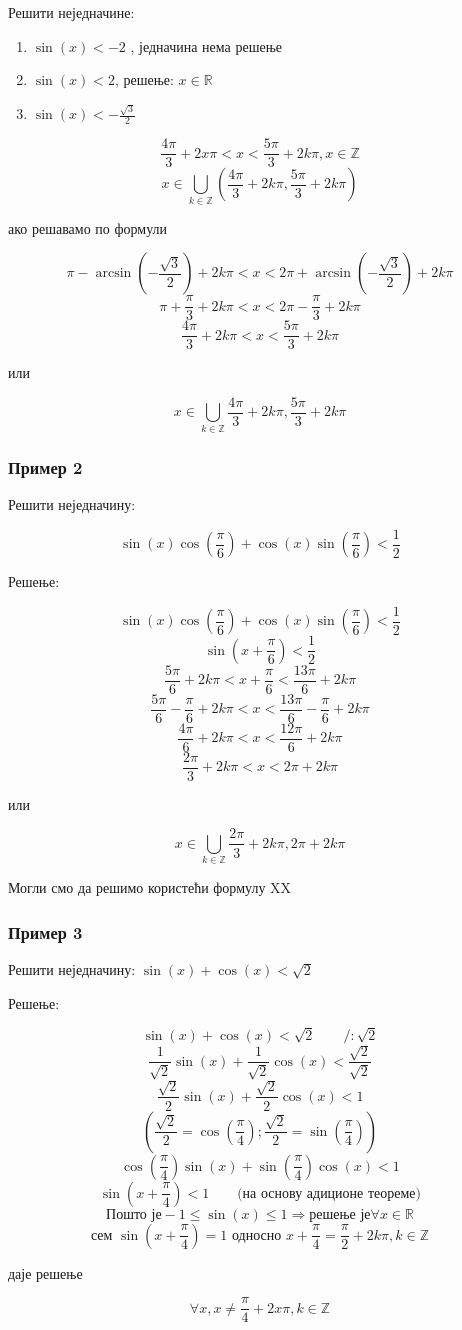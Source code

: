 \documentclass[../diplomski.tex]{subfiles}
\begin{document}
Решити неједначине:

\begin{enumerate}[label=\alph*)]
\item $\sin(x)<-2$ , једначина нема решење
\item $\sin(x)<2$, решење: $x\in\mathbb{R}$
\item $\sin(x)<-\frac{\sqrt3}{2}$
\end{enumerate}


\[\frac{4\pi}{3}+2x\pi<x<\frac{5\pi}{3}+2k\pi,x\in\mathbb{Z}\]
\[x\in\bigcup_{k\in\mathbb{Z}}(\frac{4\pi}{3}+2k\pi,\frac{5\pi}{3}+2k\pi)\]

ако решавамо по формули

\[\pi-\arcsin\left(-\frac{\sqrt{3}}{2}\right)+2k\pi<x<2\pi+\arcsin\left(-\frac{\sqrt{3}}{2}\right)+2k\pi\]
\[\pi+\frac{\pi}{3}+2k\pi<x<2\pi-\frac{\pi}{3}+2k\pi\]
\[\frac{4\pi}{3}+2k\pi<x<\frac{5\pi}{3}+2k\pi\]
\centerline{или}
\[x\in\bigcup_{k\in\mathbb{Z}}\frac{4\pi}{3}+2k\pi,\frac{5\pi}{3}+2k\pi\]


\subsubsection{Пример 2}

Решити неједначину:

\[\sin(x)\cos\left(\frac{\pi}{6}\right)+\cos(x)\sin\left(\frac{\pi}{6}\right)<\frac{1}{2}\]

Решење:

\[\sin(x)\cos\left(\frac{\pi}{6}\right)+\cos(x)\sin\left(\frac{\pi}{6}\right)<\frac{1}{2}\]
\[\sin\left(x+\frac{\pi}{6}\right)<\frac{1}{2}\]
\[\frac{5\pi}{6}+2k\pi<x+\frac{\pi}{6}<\frac{13\pi}{6}+2k\pi\]
\[\frac{5\pi}{6}-\frac{\pi}{6}+2k\pi<x<\frac{13\pi}{6}-\frac{\pi}{6}+2k\pi\]
\[\frac{4\pi}{6}+2k\pi<x<\frac{12\pi}{6}+2k\pi\]
\[\frac{2\pi}{3}+2k\pi<x<2\pi+2k\pi\]
\centerline{или}
\[x\in\bigcup_{k\in\mathbb{Z}}\frac{2\pi}{3}+2k\pi,2\pi+2k\pi\]

Могли смо да решимо користећи формулу XX


\subsubsection{Пример 3}

Решити неједначину: $\sin(x)+\cos(x)<\sqrt{2}$

Решење:

\[\sin(x)+\cos(x)<\sqrt{2}\qquad/:\sqrt{2}\]
\[\frac{1}{\sqrt{2}}\sin(x)+\frac{1}{\sqrt{2}}\cos(x)<\frac{\sqrt{2}}{\sqrt{2}}\]
\[\frac{\sqrt{2}}{2}\sin(x)+\frac{\sqrt{2}}{2}\cos(x)<1\]
\[(\frac{\sqrt{2}}{2}=\cos(\frac{\pi}{4});\frac{\sqrt{2}}{2}=\sin(\frac{\pi}{4}))\]
\[\cos(\frac{\pi}{4})\sin(x)+\sin(\frac{\pi}{4})\cos(x)<1\]
\[\sin(x+\frac{\pi}{4})<1\qquad\text{(на основу адиционе теореме)}\]
\[\text{Пошто је} -1\leqslant\sin(x)\leqslant1\Rightarrow \text{решење је} \forall x\in\mathbb{R}\]
\[\text{сем } \sin\left(x+\frac{\pi}{4}\right)=1\text{ односно }x+\frac{\pi}{4}=\frac{\pi}{2}+2k\pi,k\in\mathbb{Z}\]
\centerline{даје решење}
\[\forall x,x\neq\frac{\pi}{4}+2x\pi,k\in\mathbb{Z}\]
\end{document}
